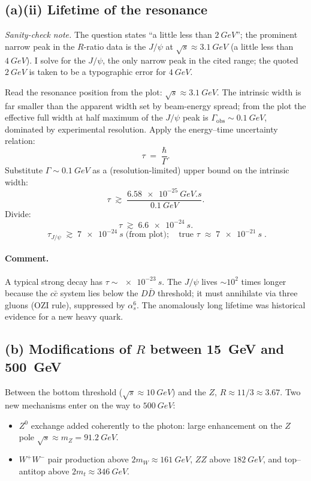 \documentclass[11pt]{article}
\begin{document}
\subsection*{(a)(ii) Lifetime of the resonance}

\emph{Sanity-check note.} The question states ``a little less than $\SI{2}{GeV}$''; the prominent narrow peak in the $R$-ratio data is the $J/\psi$ at $\sqrt s\approx\SI{3.1}{GeV}$ (a little less than $\SI{4}{GeV}$). I solve for the $J/\psi$, the only narrow peak in the cited range; the quoted $\SI{2}{GeV}$ is taken to be a typographic error for $\SI{4}{GeV}$.

Read the resonance position from the plot: $\sqrt s\approx\SI{3.1}{GeV}$. The intrinsic width is far smaller than the apparent width set by beam-energy spread; from the plot the effective full width at half maximum of the $J/\psi$ peak is $\Gamma_\text{obs}\sim\SI{0.1}{GeV}$, dominated by experimental resolution. Apply the energy--time uncertainty relation:
\[
\tau\;=\;\frac{\hbar}{\Gamma}.
\]
Substitute $\Gamma\sim\SI{0.1}{GeV}$ as a (resolution-limited) upper bound on the intrinsic width:
\[
\tau\;\gtrsim\;\frac{\SI{6.58e-25}{GeV.s}}{\SI{0.1}{GeV}}.
\]
Divide:
\[
\tau\;\gtrsim\;\SI{6.6e-24}{s}.
\]
\begin{equation}
\boxed{\;\tau_{J/\psi}\;\gtrsim\;\SI{7e-24}{s}\;\text{(from plot)};\quad\text{true }\tau\;\approx\;\SI{7e-21}{s}\;.}
\label{eq:Jpsi-lifetime}
\end{equation}
\paragraph{Comment.} A typical strong decay has $\tau\sim\SI{e-23}{s}$. The $J/\psi$ lives $\sim 10^{2}$ times longer because the $c\bar c$ system lies below the $D\bar D$ threshold; it must annihilate via three gluons (OZI rule), suppressed by $\alpha_{s}^{6}$. The anomalously long lifetime was historical evidence for a new heavy quark.

\subsection*{(b) Modifications of $R$ between \SI{15}{GeV} and \SI{500}{GeV}}

Between the bottom threshold ($\sqrt s\approx\SI{10}{GeV}$) and the $Z$, $R\approx 11/3\approx 3.67$. Two new mechanisms enter on the way to $\SI{500}{GeV}$:
\begin{itemize}
  \item $Z^{0}$ exchange added coherently to the photon: large enhancement on the $Z$ pole $\sqrt s\approx m_{Z}=\SI{91.2}{GeV}$.
  \item $W^{+}W^{-}$ pair production above $2m_{W}\approx\SI{161}{GeV}$, $ZZ$ above $\SI{182}{GeV}$, and top--antitop above $2m_{t}\approx\SI{346}{GeV}$.
\end{itemize}
\end{document}
